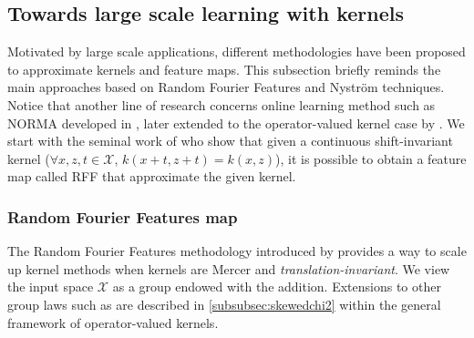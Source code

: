 \subsection{Towards large scale learning with kernels}
Motivated by large scale applications, different methodologies have been
proposed to approximate kernels and feature maps. This subsection briefly
reminds the main approaches based on  Random Fourier Features and Nystr\"om
techniques. Notice that another line of research concerns online learning
method such as \acs{NORMA} developed in \cite{kivinen2004online}, later
extended to the operator-valued kernel case by \citet{audiffren2013online}.  We
start with the seminal work of \citet{Rahimi2007} who show that given a
continuous shift-invariant kernel ($\forall x, z, t \in \mathcal{X}$, $k(x + t,
z + t) = k(x, z)$), it is possible to obtain a feature map called \acs{RFF}
that approximate the given kernel.
\subsubsection{Random Fourier Features map}
The Random Fourier Features methodology introduced  by \citet{Rahimi2007}
provides a way to scale up kernel methods when kernels are Mercer and
\emph{translation-invariant}.  We view the input space $\mathcal{X}$ as a group
endowed with the addition. Extensions to other group laws such as
\citet{li2010random} are described in \cref{subsubsec:skewedchi2} within the
general framework of operator-valued kernels.
